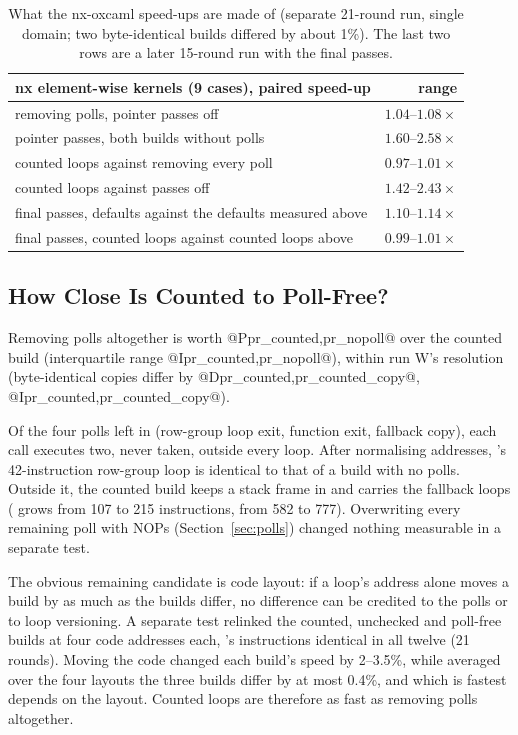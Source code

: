 \begin{table}[h]
  \centering
  \small
  \begin{tabular}{@{}lr@{}}
    \toprule
    nx element-wise kernels (9 cases), paired speed-up & range \\
    \midrule
    removing polls, pointer passes off & $1.04$--$1.08\times$ \\
    pointer passes, both builds without polls & $1.60$--$2.58\times$ \\
    counted loops against removing every poll & $0.97$--$1.01\times$ \\
    counted loops against passes off & $1.42$--$2.43\times$ \\
    \midrule
    final passes, defaults against the defaults measured above & $1.10$--$1.14\times$ \\
    final passes, counted loops against counted loops above & $0.99$--$1.01\times$ \\
    \bottomrule
  \end{tabular}
  \caption{What the nx-oxcaml speed-ups are made of (separate 21-round run,
  single domain; two byte-identical builds differed by about 1\%). The last two
  rows are a later 15-round run with the final passes.}
  \label{tab:nxablation}
\end{table}

\subsection{How Close Is Counted to Poll-Free?}
\label{sec:last2}
Removing polls altogether is worth @P{pr_counted,pr_nopoll}@ over the counted
build (interquartile range @I{pr_counted,pr_nopoll}@), within run W's
resolution (byte-identical copies differ by @D{pr_counted,pr_counted_copy}@,
@I{pr_counted,pr_counted_copy}@).

Of the four polls left in  (row-group loop exit, function exit,
fallback copy), each call executes two, never taken, outside every loop.
After normalising addresses, 's 42-instruction row-group loop is
identical to that of a build with no polls. Outside it, the counted build
keeps a stack frame in  and carries the fallback loops
( grows from 107 to 215 instructions,  from 582 to
777). Overwriting every remaining poll with NOPs (Section~\ref{sec:polls})
changed nothing measurable in a separate test.

The obvious remaining candidate is code layout: if a loop's address alone
moves a build by as much as the builds differ, no difference can be credited
to the polls or to loop versioning. A separate test relinked the counted,
unchecked and poll-free builds at four code addresses each, 's
instructions identical in all twelve (21 rounds). Moving the code changed each
build's speed by 2--3.5\%, while averaged over the four layouts the three
builds differ by at most 0.4\%, and which is fastest depends on the layout.
Counted loops are therefore as fast as removing polls altogether.

